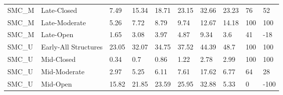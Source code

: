 \begin{sidewaystable}[!htbp]
\begin{tabular}{@{}llllllllll@{}}
\small SMC\_M                   & Late-Closed              & 7.49            & 15.34            & 18.71            & 23.15            & 32.66             & 23.\small 23                                                              & 76                                                               & \small 52                                                                 \\
\small SMC\_M                   & Late-Moderate            & 5.26            & 7.72             & 8.79             & 9.74             & 12.67             & 14.\small 18                                                              & 100                                                              & \small 100                                                                \\
\small SMC\_M                   & Late-Open                & 1.65            & 3.08             & 3.97             & 4.87             & 9.34              & 3.\small 6                                                                & 41                                                               & -\small 18                                                                \\
\small SMC\_U                   & Early-All Structures     & 23.05           & 32.07            & 34.75            & 37.52            & 44.39             & 48.\small 7                                                               & 100                                                              & \small 100                                                                \\
\small SMC\_U                   & Mid-Closed               & 0.34            & 0.7              & 0.86             & 1.22             & 2.78              & 2.\small 99                                                               & 100                                                              & \small 100                                                                \\
\small SMC\_U                   & Mid-Moderate             & 2.97            & 5.25             & 6.11             & 7.61             & 17.62             & 6.\small 77                                                               & 64                                                               & \small 28                                                                 \\
\small SMC\_U                   & Mid-Open                 & 15.82           & 21.85            & 23.59            & 25.95            & 32.88             & 5.\small 33                                                               & 0                                                                & -\small 100                                                               \\

\end{tabular}
\end{sidewaystable}
